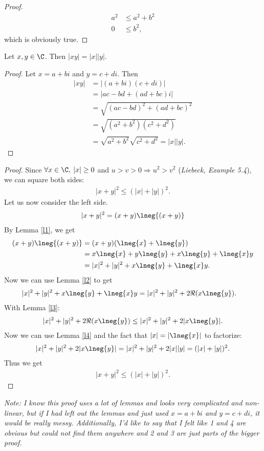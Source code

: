 \documentclass{article}
\begin{document}
\begin{adjustwidth}{2em}{0pt}
\begin{proof}
    \begin{align*}
      a^2 & \leq a^2+b^2 \\
      0   & \leq b^2,
    \end{align*}
    which is obviously true.
  \end{proof}
  \begin{lemma}
    \label{l4}
    Let $x,y\in\C$. Then $|xy|=|x||y|$.
  \end{lemma}
  \begin{proof}
    Let $x=a+bi$ and $y=c+di$. Then
    \begin{align*}
      |xy| & =|(a+bi)(c+di)|                       \\
           & =|ac-bd+(ad+bc)i|                     \\
           & =\sqrt{(ac-bd)^2+(ad+bc)^2}           \\
           & =\sqrt{(a^2+b^2)(c^2+d^2)}            \\
           & =\sqrt{a^2+b^2}\sqrt{c^2+d^2}=|x||y|.
    \end{align*}
  \end{proof}
\end{adjustwidth}
\begin{proof}
  Since $\forall x\in\C,\:|x|\geq0$ and $u>v>0\Rightarrow u^2>v^2$ (\emph{Liebeck, Example 5.4}), we can square both sides:
  \begin{align*}
    |x+y|^2\leq (|x|+|y|)^2.
  \end{align*}
  Let us now consider the left side.
  \begin{align*}
    |x+y|^2=(x+y)\lneg{(x+y)}
  \end{align*}
  By Lemma \ref{l1}, we get
  \begin{align*}
    (x+y)\lneg{(x+y)} & =(x+y)(\lneg{x}+\lneg{y})                \\
                      & =x\lneg{x}+y\lneg{y}+x\lneg{y}+\lneg{x}y \\
                      & =|x|^2+|y|^2+x\lneg{y}+\lneg{x}y.
  \end{align*}
  Now we can use Lemma \ref{l2} to get
  \begin{align*}
    |x|^2+|y|^2+x\lneg{y}+\lneg{x}y & =|x|^2+|y|^2+2\Re(x\lneg{y}).
  \end{align*}
  With Lemma \ref{l3}:
  \begin{align*}
    |x|^2+|y|^2+2\Re(x\lneg{y})\leq |x|^2+|y|^2+2|x\lneg{y}|.
  \end{align*}
  Now we can use Lemma \ref{l4} and the fact that $|x|=|\lneg{x}|$ to factorize:
  \begin{align*}
    |x|^2+|y|^2+2|x\lneg{y}| = |x|^2+|y|^2+2|x||y| = (|x|+|y|)^2.
  \end{align*}
  Thus we get
  \begin{align*}
    |x+y|^2\leq (|x|+|y|)^2.
  \end{align*}
\end{proof}
\emph{Note: I know this proof uses a lot of lemmas and looks very complicated and non-linear, but if I had left out the lemmas and just used $x=a+bi$ and $y=c+di$, it would be really messy. Additionally, I'd like to say that I felt like 1 and 4 are obvious but could not find them anywhere and 2 and 3 are just parts of the bigger proof.}
\end{document}
